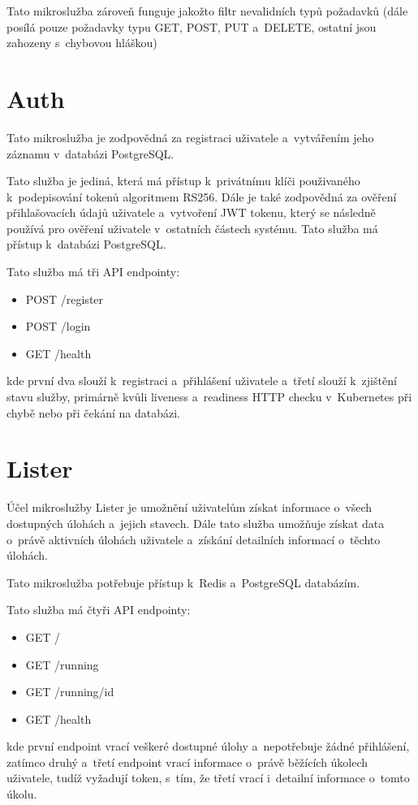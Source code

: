 \documentclass[12pt, a4paper,
oneside,      %
openright
]{report}
\begin{document}
Tato mikroslužba zároveň funguje jakožto filtr nevalidních typů požadavků (dále posílá pouze požadavky typu GET, POST, PUT a~DELETE, ostatní jsou zahozeny s~chybovou hláškou)

\section{Auth}
Tato mikroslužba je zodpovědná za registraci uživatele a~vytvářením jeho záznamu v~databázi PostgreSQL. 

Tato služba je jediná, která má přístup k~privátnímu klíči použivaného k~podepisování tokenů algoritmem RS256. Dále je také zodpovědná za ověření přihlašovacích údajů uživatele a~vytvoření JWT tokenu, který se následně používá pro ověření uživatele v~ostatních částech systému. Tato služba má přístup k~databázi PostgreSQL.

Tato služba má tři API endpointy:
\begin{itemize}
	\item POST /register
	\item POST /login
	\item GET /health
\end{itemize}
kde první dva slouží k~registraci a~přihlášení uživatele a~třetí slouží k~zjištění stavu služby, primárně kvůli liveness a~readiness HTTP checku v~Kubernetes při chybě nebo při čekání na databázi.

\section{Lister}
Účel mikroslužby Lister je umožnění uživatelům získat informace o~všech dostupných úlohách a~jejich stavech. Dále tato služba umožňuje získat data o~právě aktivních úlohách uživatele a~získání detailních informací o~těchto úlohách.

Tato mikroslužba potřebuje přístup k~Redis a~PostgreSQL databázím.

Tato služba má čtyři API endpointy:
\begin{itemize}
	\item GET /
	\item GET /running
	\item GET /running/{id}
	\item GET /health
\end{itemize}
kde první endpoint vrací veškeré dostupné úlohy a~nepotřebuje žádné přihlášení, zatímco druhý a~třetí endpoint vrací informace o~právě běžících úkolech uživatele, tudíž vyžadují token, s~tím, že třetí vrací i~detailní informace o~tomto úkolu.
\end{document}
